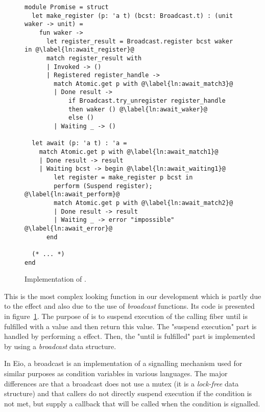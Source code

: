 \subsubsection{}
\label{sec:sched-impl-await}

\begin{figure}[ht]
  \begin{verbatim}
module Promise = struct
  let make_register (p: 'a t) (bcst: Broadcast.t) : (unit waker -> unit) =
    fun waker ->
      let register_result = Broadcast.register bcst waker in @\label{ln:await_register}@
      match register_result with
      | Invoked -> ()
      | Registered register_handle ->
        match Atomic.get p with @\label{ln:await_match3}@
        | Done result ->  
            if Broadcast.try_unregister register_handle
            then waker () @\label{ln:await_waker}@
            else ()
        | Waiting _ -> ()

  let await (p: 'a t) : 'a =
    match Atomic.get p with @\label{ln:await_match1}@
    | Done result -> result
    | Waiting bcst -> begin @\label{ln:await_waiting1}@
        let register = make_register p bcst in
        perform (Suspend register); @\label{ln:await_perform}@
        match Atomic.get p with @\label{ln:await_match2}@
        | Done result -> result 
        | Waiting _ -> error "impossible" @\label{ln:await_error}@
      end
    
  (* ... *)
end
  \end{verbatim}
  \caption{Implementation of .}
  \label{fig:sched-impl-await}
\end{figure}

This is the most complex looking function in our development which is partly due to the \esuspend{} effect and also due to the use of \emph{broadcast} functions.
Its code is presented in figure~\ref{fig:sched-impl-await}.
The purpose of  is to suspend execution of the calling fiber until  is fulfilled with a value and then return this value.
The "suspend execution" part is handled by performing a \esuspend{} effect.
Then, the "until  is fulfilled" part is implemented by using a \emph{broadcast} data structure.

In Eio, a broadcast is an implementation of a signalling mechanism used for similar purposes as condition variables in various languages.
The major differences are that a broadcast does not use a mutex (it is a \emph{lock-free} data structure) and that callers do not directly suspend execution if the condition is not met, but supply a callback that will be called when the condition is signalled.

